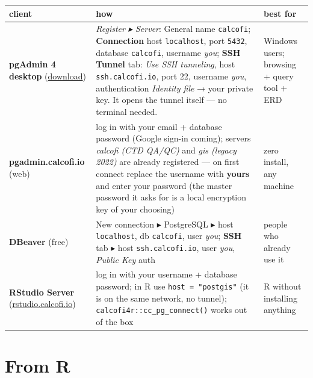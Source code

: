 \documentclass[
  letterpaper,
  DIV=11,
  numbers=noendperiod]{scrreprt}
\begin{document}
\begin{longtable}[]{@{}
  >{\raggedright\arraybackslash}p{}
  >{\raggedright\arraybackslash}p{}
  >{\raggedright\arraybackslash}p{}@{}}
\toprule\noalign{}
\begin{minipage}[b]{\linewidth}\raggedright
client
\end{minipage} & \begin{minipage}[b]{\linewidth}\raggedright
how
\end{minipage} & \begin{minipage}[b]{\linewidth}\raggedright
best for
\end{minipage} \\
\midrule\noalign{}
\endhead
\bottomrule\noalign{}
\endlastfoot
\textbf{pgAdmin 4 desktop}
(\href{https://www.pgadmin.org/download/}{download}) & \emph{Register ▸
Server}: General name \texttt{calcofi}; \textbf{Connection} host
\texttt{localhost}, port \texttt{5432}, database \texttt{calcofi},
username \emph{you}; \textbf{SSH Tunnel} tab: \emph{Use SSH tunneling},
host \texttt{ssh.calcofi.io}, port 22, username \emph{you},
authentication \emph{Identity file} → your private key. It opens the
tunnel itself --- no terminal needed. & Windows users; browsing + query
tool + ERD \\
\textbf{pgadmin.calcofi.io} (web) & log in with your email + database
password (Google sign-in coming); servers \emph{calcofi (CTD QA/QC)} and
\emph{gis (legacy 2022)} are already registered --- on first connect
replace the username with \textbf{yours} and enter your password (the
master password it asks for is a local encryption key of your choosing)
& zero install, any machine \\
\textbf{DBeaver} (free) & New connection ▸ PostgreSQL ▸ host
\texttt{localhost}, db \texttt{calcofi}, user \emph{you}; \textbf{SSH}
tab ▸ host \texttt{ssh.calcofi.io}, user \emph{you}, \emph{Public Key}
auth & people who already use it \\
\textbf{RStudio Server}
(\href{https://rstudio.calcofi.io}{rstudio.calcofi.io}) & log in with
your username + database password; in R use \texttt{host\ =\ "postgis"}
(it is on the same network, no tunnel);
\texttt{calcofi4r::cc\_pg\_connect()} works out of the box & R without
installing anything \\
\end{longtable}

\section{From R}\label{sec-r}
\end{document}
